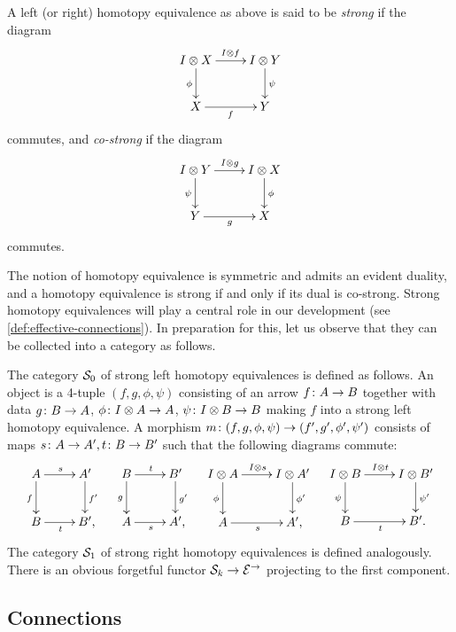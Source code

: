 \documentclass[reqno,10pt,a4paper,oneside,draft]{amsart}
\begin{document}
\begin{definition} \label{def:strhe}
A left (or right) homotopy equivalence as above is said to be \emph{strong} if the diagram
\[
\xymatrix{
  \interval \otimes X \ar[r]^{\interval \otimes f} \ar[d]_{\phi} & \interval \otimes Y \ar[d]^{\psi} \\
  X \ar[r]_{f} & Y
}
\]
commutes, and \emph{co-strong} if the diagram
\[
  \xymatrix{
  \interval \otimes Y \ar[r]^{\interval \otimes g} \ar[d]_{\psi} & \interval \otimes X \ar[d]^{\phi} \\
  Y \ar[r]_{g} & X
}
\]
commutes.
\end{definition}

The notion of homotopy equivalence is symmetric and admits an evident duality, and a homotopy equivalence is strong if and only if its dual is co-strong.
Strong homotopy equivalences will play a central role in our development (see \cref{def:effective-connections}).
In preparation for this, let us observe that they can be collected into a category as follows.

The category $\cal{S}_0$ of strong left homotopy equivalences is defined as follows.
An object is a 4-tuple $(f, g, \phi, \psi)$ consisting of an arrow $f \co A \to B$ together with data $g \co B \to A$, $\phi \co \interval \otimes A \to A$, $\psi \co \interval \otimes B \to B$ making $f$ into a strong left homotopy equivalence.
A morphism $m \co (f, g, \phi, \psi) \to (f', g', \phi', \psi')$ consists of maps $s \co A \to A', t \co B \to B'$ such that the following diagrams commute:
\begin{align*}
\xymatrix{
  A
  \ar[r]^{s}
  \ar[d]_{f}
&
  A'
  \ar[d]^{f'}
\\
  B
  \ar[r]_{t}
&
  B'\rlap{,}
}
&&
\xymatrix{
  B
  \ar[r]^{t}
  \ar[d]_{g}
&
  B'
  \ar[d]^{g'}
\\
  A
  \ar[r]_{s}
&
  A'\rlap{,}
}
&&
\xymatrix{
  \interval \otimes A
  \ar[d]_{\phi}
  \ar[r]^{\interval \otimes s}
&
  I \otimes A'
  \ar[d]^{\phi'}
\\
  A
  \ar[r]_{s}
&
  A' \rlap{,}
}
&&
\xymatrix{
  \interval \otimes B
  \ar[d]_{\psi}
  \ar[r]^{\interval \otimes t}
&
  I \otimes B'
  \ar[d]^{\psi'}
\\
  B
  \ar[r]_{t}
&
  B' \rlap{.}
}
\end{align*}
The category $\cal{S}_1$ of strong right homotopy equivalences is defined analogously.
There is an obvious forgetful functor $\cal{S}_k \to \catE^\to$ projecting to the first component.

\subsection*{Connections}
\end{document}
